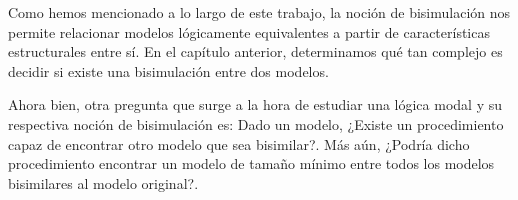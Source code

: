 

    


        


    



Como hemos mencionado a lo largo de este trabajo, la noción de bisimulación nos permite relacionar modelos lógicamente equivalentes a partir de 
características estructurales entre sí. En el capítulo anterior, determinamos qué tan complejo es decidir si existe una bisimulación entre dos 
modelos.

Ahora bien, otra pregunta que surge a la hora de estudiar una lógica modal y su respectiva noción de bisimulación es:
Dado un modelo, ¿Existe un procedimiento capaz de encontrar otro modelo que sea bisimilar?. Más aún, ¿Podría dicho procedimiento encontrar 
un modelo de tamaño mínimo entre todos los modelos bisimilares al modelo original?.

